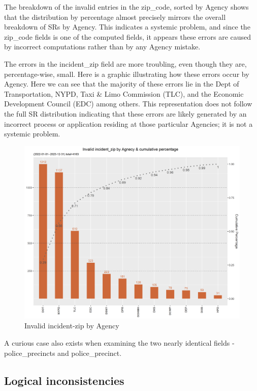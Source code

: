 \documentclass[12pt, titlepage]{article}
\begin{document}
The breakdown of the invalid entries in the zip\_code, sorted by Agency shows that the distribution by percentage
almost precisely mirrors the overall breakdown of SRs by Agency. This indicates a systemic problem, and since the
zip\_code fields is one of the computed fields, it appears these errors are caused by incorrect computations rather
than by any Agency mistake.

The  errors in the incident\_zip field are more troubling, even though they are, percentage-wise, small. Here is a graphic 
illustrating how these errors occur by Agency. Here we can see that the majority of these errors lie in the Dept of Transportation,
NYPD, Taxi \& Limo Commission (TLC), and the Economic Development Council (EDC) among others. This representation
does not follow the full SR distribution indicating that these errors are likely generated by an incorrect
process or application residing at those particular Agencies; it is not a systemic problem.

\begin{figure}[htbp]
  \centering
	  \includegraphics[scale=0.7]{invalid_incident_zip.png}
	  \caption{Invalid incident-zip by Agency}
	  \label{fig:invalid_incident_zip}
\end{figure}

A curious case also exists when examining the two nearly identical fields - police\_precincts and police\_precinct. 
 

\subsection{Logical inconsistencies }
\end{document}
